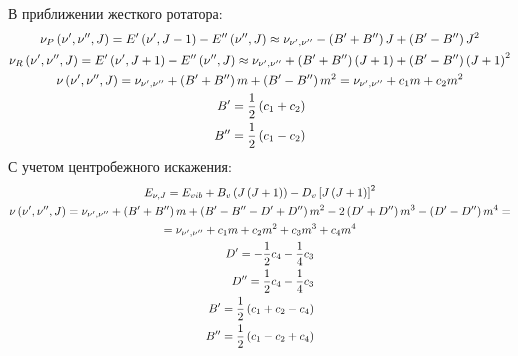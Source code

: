 \documentclass[13pt]{extarticle}
\newcommand{\lb}{\left(}
\newcommand{\rb}{\right)}
\newcommand{\dprime}{{\prime\prime}}
\begin{document}
В приближении жесткого ротатора:
\begin{gather}
\nu_P \lb \nu^\prime, \nu^{\prime\prime}, J \rb = E^\prime \lb \nu^\prime, J - 1 \rb - E^{\prime\prime}\lb \nu^{\dprime}, J \rb \approx \notag \nu_{\nu^\prime,\nu^\dprime} - \lb B^\prime + B^\dprime \rb J + \lb B^\prime - B^\dprime \rb J^2 \notag \\
\nu_R \lb \nu^\prime, \nu^\dprime, J \rb = E^\prime \lb \nu^\prime, J + 1 \rb - E^\dprime \lb \nu^\dprime, J \rb \approx \nu_{\nu^\prime, \nu^\dprime} + \lb B^\prime + B^\dprime \rb \lb J + 1 \rb + \lb B^\prime - B^\dprime \rb \lb J + 1 \rb^2 \notag \\
\nu \lb \nu^\prime, \nu^\dprime, J \rb = \nu_{\nu^\prime, \nu^\dprime} + \lb B^\prime + B^\dprime \rb m + \lb B^\prime - B^\dprime \rb m^2 = \nu_{\nu^\prime, \nu^\dprime} + c_1 m + c_2 m^2 \notag \\
\begin{aligned}
	B^\prime = \frac{1}{2} \lb c_1 + c_2 \rb \\
	B^\dprime = \frac{1}{2} \lb c_1 - c_2 \rb
\end{aligned} \notag
\end{gather} 
С учетом центробежного искажения:
\begin{gather}
E_{\nu, J} = E_{vib} + B_v \lb J \lb J + 1 \rb \rb - D_v \left[ J \lb J + 1 \rb \right]^2 \notag \\
\nu \lb \nu^\prime, \nu^\dprime, J \rb = \nu_{\nu^\prime, \nu^\dprime} + \lb B^\prime + B^\dprime \rb m + \lb B^\prime - B^\dprime - D^\prime + D^\dprime \rb m^2 - 2 \lb D^\prime + D^\dprime \rb m^3 - \lb D^\prime - D^\dprime \rb m^4  = \notag \\
= \nu_{\nu^\prime, \nu^\dprime} + c_1 m + c_2 m^2 + c_3 m^3 + c_4 m^4 \notag \\ 
\begin{aligned}
	D^\prime = -\frac{1}{2} c_4 - \frac{1}{4} c_3 \\
	D^\dprime = \frac{1}{2} c_4 - \frac{1}{4} c_3 \\
	B^\prime = \frac{1}{2} \lb c_1 + c_2 - c_4 \rb \\
	B^\dprime = \frac{1}{2} \lb c_1 - c_2 + c_4 \rb
\end{aligned} \notag
\end{gather}
\end{document}
